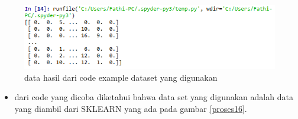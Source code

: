 \begin{enumerate}
\begin{figure}
\centerline{\includegraphics[width=1\textwidth]{figures/fathi/15.PNG}}
\caption{data hasil dari code example dataset yang digunakan}
\label{proses15}
\end{figure}
\begin{itemize}
\item
dari code yang dicoba diketahui bahwa data set yang digunakan adalah data yang diambil dari SKLEARN yang ada pada gambar \ref{proses16}.
\end{itemize}
\end{enumerate}
